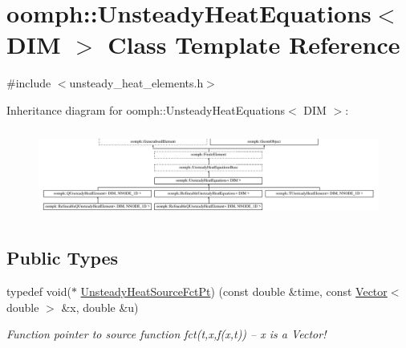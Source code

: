 \hypertarget{classoomph_1_1UnsteadyHeatEquations}{}\section{oomph\+:\+:Unsteady\+Heat\+Equations$<$ D\+IM $>$ Class Template Reference}
\label{classoomph_1_1UnsteadyHeatEquations}


{\ttfamily \#include $<$unsteady\+\_\+heat\+\_\+elements.\+h$>$}

Inheritance diagram for oomph\+:\+:Unsteady\+Heat\+Equations$<$ D\+IM $>$\+:\begin{figure}[H]
\begin{center}
\leavevmode
\includegraphics[height=2.955145cm]{classoomph_1_1UnsteadyHeatEquations}
\end{center}
\end{figure}
\subsection*{Public Types}
\begin{DoxyCompactItemize}
\item 
typedef void($\ast$ \hyperlink{classoomph_1_1UnsteadyHeatEquations_a967135cc2be2cb4b16fe0dc0b4d68a68}{Unsteady\+Heat\+Source\+Fct\+Pt}) (const double \&time, const \hyperlink{classoomph_1_1Vector}{Vector}$<$ double $>$ \&x, double \&u)
\begin{DoxyCompactList}\small\item\em Function pointer to source function fct(t,x,f(x,t)) -- x is a Vector! \end{DoxyCompactList}\end{DoxyCompactItemize}
